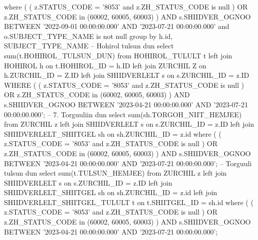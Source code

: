 \begin{mycode}[caption =, language = SQL]
    where 
      (
        (
          z.STATUS_CODE = '8053' 
          and z.ZH_STATUS_CODE is null
        ) 
        OR z.ZH_STATUS_CODE in (60002, 60005, 60003)
      ) 
      AND s.SHIIDVER_OGNOO BETWEEN '2022-09-01 00:00:00.000' 
      AND '2023-07-21 00:00:00.000' 
      and o.SUBJECT_TYPE_NAME is not null 
    group by 
      h.id, 
      SUBJECT_TYPE_NAME -- Hohirol tulsun dun
    select 
      sum(t.HOHIROL_TULSUN_DUN) 
    from 
      HOHIROL_TULULT t 
      left join HOHIROL h on t.HOHIROL_ID = h.ID 
      left join ZURCHIL Z on h.ZURCHIL_ID = Z.ID 
      left join SHIIDVERLELT s on s.ZURCHIL_ID = z.ID 
    WHERE 
      (
        (
          z.STATUS_CODE = '8053' 
          and z.ZH_STATUS_CODE is null
        ) 
        OR z.ZH_STATUS_CODE in (60002, 60005, 60003)
      ) 
      AND s.SHIIDVER_OGNOO BETWEEN '2023-04-21 00:00:00.000' 
      AND '2023-07-21 00:00:00.000';
    -- 7. Torguuliin dun
    select 
      sum(sh.TORGOH_NIIT_HEMJEE) 
    from 
      ZURCHIL z 
      left join SHIIDVERLELT s on s.ZURCHIL_ID = z.ID 
      left join SHIIDVERLELT_SHIITGEL sh on sh.ZURCHIL_ID = z.id 
    where 
      (
        (
          z.STATUS_CODE = '8053' 
          and z.ZH_STATUS_CODE is null
        ) 
        OR z.ZH_STATUS_CODE in (60002, 60005, 60003)
      ) 
      AND s.SHIIDVER_OGNOO BETWEEN '2023-04-21 00:00:00.000' 
      AND '2023-07-21 00:00:00.000';
    --  Torguuli tulsun dun
    select 
      sum(t.TULSUN_HEMJEE) 
    from 
      ZURCHIL z 
      left join SHIIDVERLELT s on s.ZURCHIL_ID = z.ID 
      left join SHIIDVERLELT_SHIITGEL sh on sh.ZURCHIL_ID = z.id 
      left join SHIIDVERLELT_SHIITGEL_TULULT t on t.SHIITGEL_ID = sh.id 
    where 
      (
        (
          z.STATUS_CODE = '8053' 
          and z.ZH_STATUS_CODE is null
        ) 
        OR z.ZH_STATUS_CODE in (60002, 60005, 60003)
      ) 
      AND s.SHIIDVER_OGNOO BETWEEN '2023-04-21 00:00:00.000' 
      AND '2023-07-21 00:00:00.000';
    \end{mycode}
    
